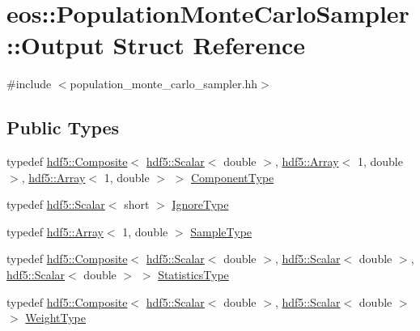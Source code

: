\hypertarget{structeos_1_1PopulationMonteCarloSampler_1_1Output}{
\section{eos::PopulationMonteCarloSampler::Output Struct Reference}
\label{structeos_1_1PopulationMonteCarloSampler_1_1Output}
}


{\ttfamily \#include $<$population\_\-monte\_\-carlo\_\-sampler.hh$>$}\subsection*{Public Types}
\begin{DoxyCompactItemize}
\item 
typedef \hyperlink{classeos_1_1hdf5_1_1Composite}{hdf5::Composite}$<$ \hyperlink{classeos_1_1hdf5_1_1Scalar}{hdf5::Scalar}$<$ double $>$, \hyperlink{classeos_1_1hdf5_1_1Array}{hdf5::Array}$<$ 1, double $>$, \hyperlink{classeos_1_1hdf5_1_1Array}{hdf5::Array}$<$ 1, double $>$ $>$ \hyperlink{structeos_1_1PopulationMonteCarloSampler_1_1Output_a5fd76b324d88b7fbd14306e8a15e4db9}{ComponentType}
\item 
typedef \hyperlink{classeos_1_1hdf5_1_1Scalar}{hdf5::Scalar}$<$ short $>$ \hyperlink{structeos_1_1PopulationMonteCarloSampler_1_1Output_aa7e9c8fa59ff4cc77d830c9c2661435e}{IgnoreType}
\item 
typedef \hyperlink{classeos_1_1hdf5_1_1Array}{hdf5::Array}$<$ 1, double $>$ \hyperlink{structeos_1_1PopulationMonteCarloSampler_1_1Output_ab096268a8fccb7e8d34ed08b93df880c}{SampleType}
\item 
typedef \hyperlink{classeos_1_1hdf5_1_1Composite}{hdf5::Composite}$<$ \hyperlink{classeos_1_1hdf5_1_1Scalar}{hdf5::Scalar}$<$ double $>$, \hyperlink{classeos_1_1hdf5_1_1Scalar}{hdf5::Scalar}$<$ double $>$, \hyperlink{classeos_1_1hdf5_1_1Scalar}{hdf5::Scalar}$<$ double $>$ $>$ \hyperlink{structeos_1_1PopulationMonteCarloSampler_1_1Output_abe071d58f8cee75754bcc593ec33e9b8}{StatisticsType}
\item 
typedef \hyperlink{classeos_1_1hdf5_1_1Composite}{hdf5::Composite}$<$ \hyperlink{classeos_1_1hdf5_1_1Scalar}{hdf5::Scalar}$<$ double $>$, \hyperlink{classeos_1_1hdf5_1_1Scalar}{hdf5::Scalar}$<$ double $>$ $>$ \hyperlink{structeos_1_1PopulationMonteCarloSampler_1_1Output_a4413a52234bdb64d96f842ad524a7ee8}{WeightType}
\end{DoxyCompactItemize}

